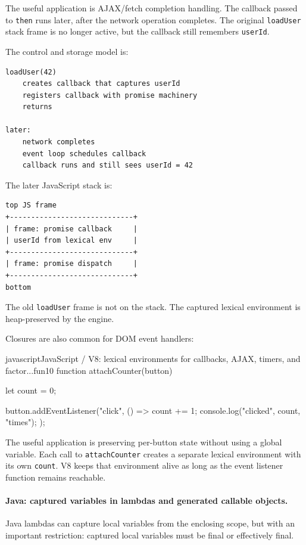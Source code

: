 The useful application is AJAX/fetch completion handling. The callback passed to \texttt{then} runs later, after the network operation completes. The original \texttt{loadUser} stack frame is no longer active, but the callback still remembers \texttt{userId}.

The control and storage model is:

\begin{verbatim}
loadUser(42)
    creates callback that captures userId
    registers callback with promise machinery
    returns

later:
    network completes
    event loop schedules callback
    callback runs and still sees userId = 42
\end{verbatim}

The later JavaScript stack is:

\begin{verbatim}
top JS frame
+-----------------------------+
| frame: promise callback     |
| userId from lexical env     |
+-----------------------------+
| frame: promise dispatch     |
+-----------------------------+
bottom
\end{verbatim}

The old \texttt{loadUser} frame is not on the stack. The captured lexical environment is heap-preserved by the engine.

Closures are also common for DOM event handlers:

\begin{codebox}[]{javascript}{JavaScript / V8: lexical environments for callbacks, AJAX, timers, and factor...}{fun10}
function attachCounter(button) {
    let count = 0;

    button.addEventListener("click", () => {
        count += 1;
        console.log("clicked", count, "times");
    });
}
\end{codebox}


The useful application is preserving per-button state without using a global variable. Each call to \texttt{attachCounter} creates a separate lexical environment with its own \texttt{count}. V8 keeps that environment alive as long as the event listener function remains reachable.

\paragraph{Java: captured variables in lambdas and generated callable objects.}

Java lambdas can capture local variables from the enclosing scope, but with an important restriction: captured local variables must be final or effectively final.

